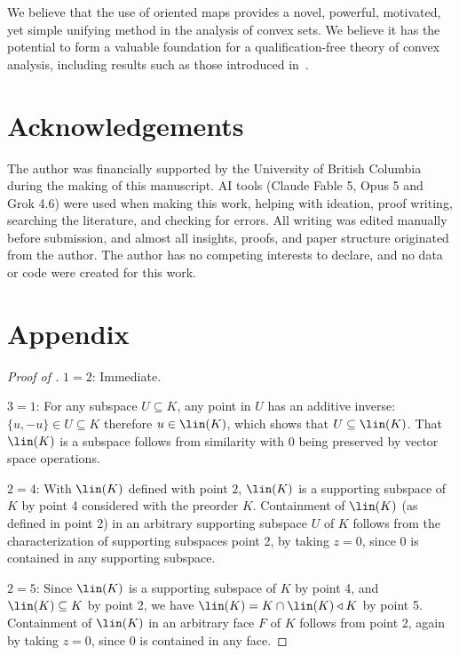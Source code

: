 \documentclass{article}
\theoremstyle{plain}
\theoremstyle{definition}
\theoremstyle{remark}
\begin{document}
We believe that the use of oriented maps provides a novel, powerful, motivated, yet simple unifying method in the analysis of convex sets. We believe it has the potential to form a valuable foundation for a qualification-free theory of convex analysis, including results such as those introduced in~\cite{scottBilateralFacialReduction2026}.
\section{Acknowledgements}
\label{loc:body.acknowledgements}
The author was financially supported by the University of British Columbia during the making of this manuscript. 
AI tools (Claude Fable 5, Opus 5 and Grok 4.6) were used when making this work, helping with ideation, proof writing, searching the literature, and checking for errors. All writing was edited manually before submission, and almost all insights,
proofs, and paper structure originated from the author.
The author has no competing interests to declare, and no data or code were created for this work.
\printbibliography
\appendix
\section{Appendix}
\begin{proof}[\hypertarget{loc:characterization_of_the_lineality.proof}{}Proof of ]

$1 = 2$: Immediate.

$3 = 1$: For any subspace $U \subseteq K$, any point in $U$ has an additive inverse: $\{ u, -u \}  \in U \subseteq K$ therefore $u \in \lin(K)$, which shows that $U \subseteq \lin(K)$. That $\lin(K)$ is a subspace follows from similarity with $0$ being preserved by vector space operations.

$2 = 4$: With $\lin(K)$ defined with point $2$, $\lin(K)$ is a supporting subspace of $K$ by  point 4 considered with the preorder $K$. Containment of $\lin(K)$ (as defined in point 2) in an arbitrary supporting subspace $U$ of $K$ follows from the characterization of supporting subspaces  point 2, by taking $z = 0$, since $0$ is contained in any supporting subspace.

$2 = 5$: Since $\lin(K)$ is a supporting subspace of $K$ by point 4, and $\lin(K) \subseteq K$ by point 2, we have $\lin(K) = K \cap \lin(K) \triangleleft K$ by  point 5. Containment of $\lin(K)$ in an arbitrary face $F$ of $K$ follows from  point 2, again by taking $z = 0$, since $0$ is contained in any face.
\end{proof}
\end{document}
